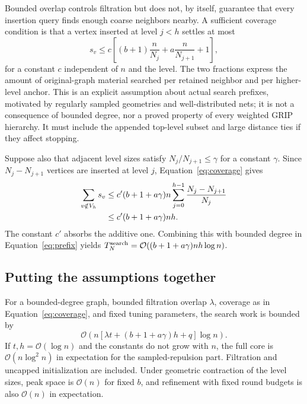 \documentclass[11pt,a4paper]{article}
\newcommand{\bigO}{\mathcal O}
\begin{document}
Bounded overlap controls filtration but does not, by itself, guarantee that
every insertion query finds enough coarse neighbors nearby. A sufficient
coverage condition is that a vertex inserted at level $j<h$ settles at most
\begin{equation}
 s_v\leq c\!\left[
   (b+1)\frac{n}{N_j}
   +a\frac{n}{N_{j+1}}+1\right],
 \label{eq:coverage}
\end{equation}
for a constant $c$ independent of $n$ and the level. The two fractions express
the amount of original-graph material searched per retained neighbor and per
higher-level anchor. This is an explicit assumption about actual search
prefixes, motivated by regularly sampled geometries and well-distributed nets;
it is not a consequence of bounded degree, nor a proved property of every
weighted GRIP hierarchy. It must include the appended top-level subset and
large distance ties if they affect stopping.

Suppose also that adjacent level sizes satisfy $N_j/N_{j+1}\leq\gamma$ for a
constant $\gamma$. Since $N_j-N_{j+1}$ vertices are inserted at level $j$,
Equation~\eqref{eq:coverage} gives
\begin{align}
 \sum_{v\notin V_h}s_v
 &\leq c' (b+1+a\gamma)n
     \sum_{j=0}^{h-1}\frac{N_j-N_{j+1}}{N_j} \notag\\
 &\leq c'(b+1+a\gamma)nh .
 \label{eq:coverage-sum}
\end{align}
The constant $c'$ absorbs the additive one. Combining this with bounded degree
in Equation~\eqref{eq:prefix} yields
$T_N^{\rm search}=\bigO((b+1+a\gamma)nh\log n)$.

\subsection{Putting the assumptions together}

For a bounded-degree graph, bounded filtration overlap $\lambda$, coverage
as in Equation~\eqref{eq:coverage}, and fixed tuning parameters, the search work
is bounded by
\begin{equation}
 \bigO\!\left(n[\lambda t+(b+1+a\gamma)h+q]\log n\right).
 \label{eq:conditional}
\end{equation}
If $t,h=\bigO(\log n)$ and the constants do not grow with $n$, the full core is
$\bigO(n\log^2 n)$ in expectation for the sampled-repulsion part. Filtration
and uncapped initialization are included. Under geometric contraction of the
level sizes, peak space is $\bigO(n)$ for fixed $b$, and refinement with fixed
round budgets is also $\bigO(n)$ in expectation.
\end{document}

